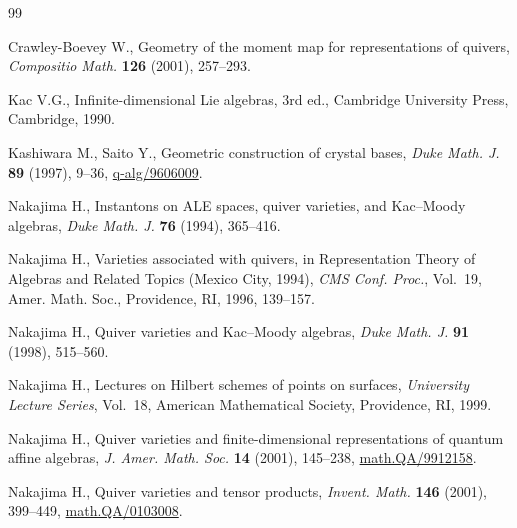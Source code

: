 %
\begin{thebibliography}{99}

Crawley-Boevey W., Geometry of the moment map for representations of
  quivers, {\it Compositio Math.} \textbf{126} (2001),   257--293.


 Kac V.G., Inf\/inite-dimensional Lie algebras, 3rd ed., Cambridge
  University Press, Cambridge, 1990. %


Kashiwara M., Saito Y., Geometric construction of crystal bases, {\it Duke
  Math. J.} \textbf{89} (1997),  9--36,  \mbox{\href{http://arxiv.org/abs/q-alg/9606009}{q-alg/9606009}}. %


Nakajima H., Instantons on {ALE} spaces, quiver varieties, and
  Kac--Moody algebras, {\it Duke Math. J.} \textbf{76} (1994), 365--416.


Nakajima H., Varieties associated with quivers, in Representation Theory of
  Algebras and Related Topics (Mexico City, 1994), {\it CMS Conf. Proc.}, Vol.~19,
  Amer. Math. Soc., Providence, RI, 1996, 139--157.


Nakajima H., Quiver varieties and Kac--Moody algebras, {\it Duke Math. J.}
  \textbf{91} (1998), 515--560. %


Nakajima H., Lectures on Hilbert schemes of points on surfaces, {\it University
  Lecture Series}, Vol.~18, American Mathematical Society, Providence, RI, 1999.


Nakajima H., Quiver varieties and f\/inite-dimensional representations of
  quantum af\/f\/ine algebras, {\it J. Amer. Math. Soc.} \textbf{14} (2001),
  145--238, \href{http://arxiv.org/abs/math.QA/9912158}{math.QA/9912158}. %


Nakajima H., Quiver varieties and tensor products, {\it Invent. Math.}
  \textbf{146} (2001), 399--449, \href{http://arxiv.org/abs/math.QA/0103008}{math.QA/0103008}. %



\end{thebibliography}
